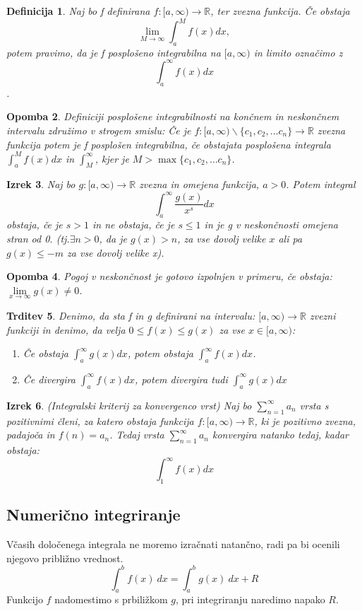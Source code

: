 \documentclass[11pt]{article}
\newtheorem{Izrek}{{\sc Izrek}}[section]
\newtheorem{Trditev}[Izrek]{{\sc Trditev}}
\newtheorem{Definicija}[Izrek]{{\sc Definicija}}
\newtheorem{Opomba}[Izrek]{{\sc Opomba}}
\begin{document}
\begin{Definicija}
	Naj bo f definirana $f:[a,\infty) \to \mathbb{R}$, ter zvezna funkcija. Če obstaja 
	$$\lim\limits_{M\to \infty}\int_{a}^{M}{f(x)dx},$$ potem pravimo, da je f posplošeno integrabilna na $[a,\infty)$ in limito označimo z $$\int_{a}^{\infty}{f(x) dx}$$.
\end{Definicija}
\begin{Opomba}
	Definiciji posplošene integrabilnosti na končnem in neskončnem intervalu združimo v strogem smislu:
	Če je $f: [a,\infty)\backslash \{c_1, c_2,\dots c_n\} \to \mathbb{R}$ zvezna funkcija potem je f posplošen integrabilna, če obstajata posplošena integrala $\int_{a}^{M}{f(x)dx}$ in $\int_{M}^{\infty}$, kjer je $M> \max\{c_1,c_2, \dots c_n\}$.
\end{Opomba}
\begin{Izrek}
	Naj bo $g: [a,\infty) \to \mathbb{R}$ zvezna in omejena funkcija, $a>0$. Potem integral $$\int_{a}^{\infty}{\frac{g(x)}{x^{s}}dx}$$ obstaja, če je $s > 1$ in  ne obstaja, če je $s \le 1$ in je g v neskončnosti omejena stran od 0. (tj.$\exists n>0$, da je $g(x) >n$, za vse dovolj velike $x$ ali pa $g(x) \le -m$ za vse dovolj velike x).
\end{Izrek}
\begin{Opomba}
	Pogoj v neskončnost je gotovo izpolnjen v primeru, če obstaja: $\lim\limits_{x\to \infty}{g(x)}\ne 0$.
\end{Opomba}
\begin{Trditev}
	Denimo, da sta f in g definirani na intervalu: $[a,\infty) \to \mathbb{R}$ zvezni funkciji in denimo, da velja $0\le f(x) \le g(x)$ za vse $x\in [a,\infty)$:
	\begin{enumerate}
		\item
		Če obstaja $\int_{a}^{\infty}{g(x) dx}$, potem obstaja $\int_{a}^{\infty}{f(x) dx}$.
		\item
		Če divergira $\int_{a}^{\infty}{f(x) dx}$, potem divergira tudi $\int_{a}^{\infty}{g(x) dx}$
	\end{enumerate}
\end{Trditev}
\begin{Izrek}
	(Integralski kriterij za konvergenco vrst)
	Naj bo $\sum_{n=1}^{\infty}{a_n}$ vrsta s pozitivnimi členi, za katero obstaja funkcija $f: [a,\infty) \to \mathbb{R}$, ki je pozitivno zvezna, padajoča in $f(n) = a_n$. Tedaj vrsta $\sum_{n=1}^{\infty}{a_n}$ konvergira natanko tedaj, kadar obstaja:
	$$\int_{1}^{\infty}{f(x) dx}$$
\end{Izrek}
\subsection{Numerično integriranje}
Včasih določenega integrala ne moremo izračnati natančno, radi pa bi ocenili njegovo približno vrednost.
$$\int_{a}^{b}{f(x) \ dx} = \int_{a}^{b}{g(x) \ dx} + R$$
Funkcijo $f$ nadomestimo s prbiližkom $g$, pri integriranju naredimo napako $R$.
\end{document}
